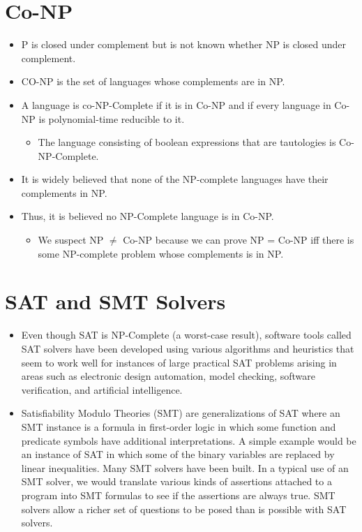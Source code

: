 \documentclass[]{article}
\begin{document}
\section{Co-NP}
\begin{itemize}
\item P is closed under complement but is not known whether NP is closed under
complement.
\item CO-NP is the set of languages whose complements are in NP.
\item A language is co-NP-Complete if it is in Co-NP and if every language in
Co-NP is polynomial-time reducible to it.
\begin{itemize}
\item The language consisting of boolean expressions that are tautologies is Co-
NP-Complete.
\end{itemize}
\item It is widely believed that none of the NP-complete languages have their
complements in NP.
\item Thus, it is believed no NP-Complete language is in Co-NP.
\begin{itemize}
\item We suspect NP $\neq$ Co-NP because we can prove NP = Co-NP iff there is
some NP-complete problem whose complements is in NP.
\end{itemize}
\end{itemize}

\section{SAT and SMT Solvers}
\begin{itemize}
\item Even though SAT is NP-Complete (a worst-case result), software tools
called SAT solvers have been developed using various algorithms and heuristics
that seem to work well for instances of large practical SAT problems arising in
areas such as electronic design automation, model checking, software
verification, and artificial intelligence.
\item Satisfiability Modulo Theories (SMT) are generalizations of SAT where an
SMT instance is a formula in first-order logic in which some function and
predicate symbols have additional interpretations. A simple example would be an
instance of SAT in which some of the binary variables are replaced by linear
inequalities. Many SMT solvers have been built. In a typical use of an SMT
solver, we would translate various kinds of assertions attached to a program
into SMT formulas to see if the assertions are always true. SMT solvers allow a
richer set of questions to be posed than is possible with SAT solvers.
\end{itemize}
\end{document}
